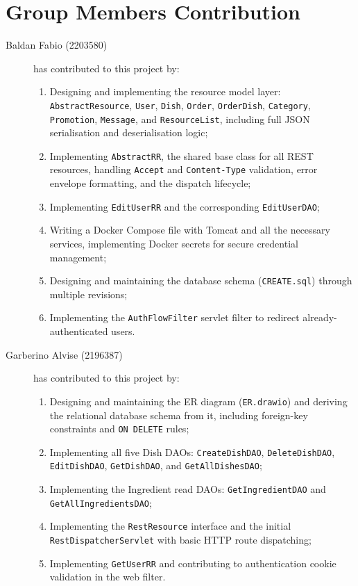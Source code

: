 \section{Group Members Contribution}

\begin{description}
	\item[Baldan Fabio (2203580)] has contributed to this project by:
    \begin{enumerate}
        \item Designing and implementing the resource model layer: \texttt{AbstractResource}, \texttt{User}, \texttt{Dish}, \texttt{Order}, \texttt{OrderDish}, \texttt{Category}, \texttt{Promotion}, \texttt{Message}, and \texttt{ResourceList}, including full JSON serialisation and deserialisation logic;
        \item Implementing \texttt{AbstractRR}, the shared base class for all REST resources, handling \texttt{Accept} and \texttt{Content-Type} validation, error envelope formatting, and the dispatch lifecycle;
        \item Implementing \texttt{EditUserRR} and the corresponding \texttt{EditUserDAO};
        \item Writing a Docker Compose file with Tomcat and all the necessary services, implementing Docker secrets for secure credential management;
        \item Designing and maintaining the database schema (\texttt{CREATE.sql}) through multiple revisions;
        \item Implementing the \texttt{AuthFlowFilter} servlet filter to redirect already-authenticated users.
    \end{enumerate}

	\item[Garberino Alvise (2196387)] has contributed to this project by:
    \begin{enumerate}
        \item Designing and maintaining the ER diagram (\texttt{ER.drawio}) and deriving the relational database schema from it, including foreign-key constraints and \texttt{ON DELETE} rules;
        \item Implementing all five Dish DAOs: \texttt{CreateDishDAO}, \texttt{DeleteDishDAO}, \texttt{EditDishDAO}, \texttt{GetDishDAO}, and \texttt{GetAllDishesDAO};
        \item Implementing the Ingredient read DAOs: \texttt{GetIngredientDAO} and \texttt{GetAllIngredientsDAO};
        \item Implementing the \texttt{RestResource} interface and the initial \texttt{RestDispatcherServlet} with basic HTTP route dispatching;
        \item Implementing \texttt{GetUserRR} and contributing to authentication cookie validation in the web filter.
    \end{enumerate}


\end{description}
